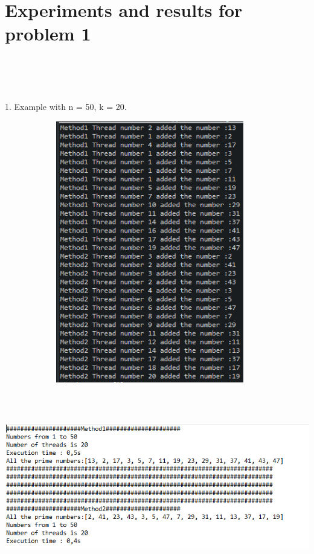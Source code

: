 \documentclass[14pt]{article}
\begin{document}
\section*{Experiments and results for problem 1}
\\\\\\
\begin{center}
1. Example with n = 50, k = 20.
\vspace{10mm}

\includegraphics[height=4.5in, width = 5in]{5020thread.png}\\
\includegraphics[height=3.5in, width = 6in]{5020result.png}\\
\newpage
\end{center}\\
\end{document}
